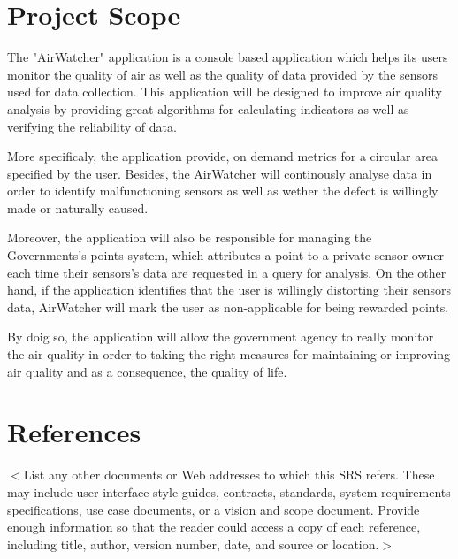 \documentclass{report}
\begin{document}

\section{Project Scope}
The "AirWatcher" application is a {console} based application which helps its users monitor the quality of air as well as the quality of data
provided by the sensors used for data collection. This application will be designed to improve air quality analysis by providing great algorithms
for calculating indicators as well as verifying the reliability of data.

More specificaly, the application provide, on demand metrics for a circular area specified by the user. Besides, the AirWatcher will continously analyse
data in order to identify malfunctioning sensors as well as wether the defect is willingly made or naturally caused.

Moreover, the application will also be responsible for managing the Governments's points system, which attributes a point to a private sensor owner each time
their sensors's data are requested in a query for analysis. On the other hand, if the application identifies that the user is willingly distorting their
sensors data, AirWatcher will mark the user as non-applicable for being rewarded points.

By doig so, the application will allow the government agency to really monitor the air quality in order to taking the right measures for maintaining
or improving air quality and as a consequence, the quality of life.


\section{References}
$<$List any other documents or Web addresses to which this SRS refers. These may
include user interface style guides, contracts, standards, system requirements
specifications, use case documents, or a vision and scope document. Provide
enough information so that the reader could access a copy of each reference,
including title, author, version number, date, and source or location.$>$
\end{document}
